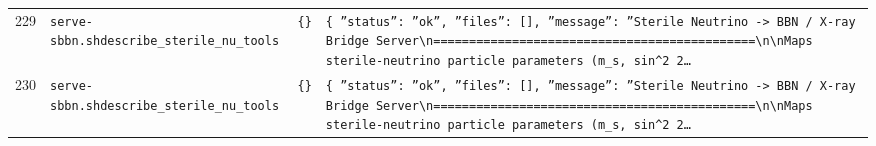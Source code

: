 \documentclass[11pt,a4paper]{article}
\begin{document}
\begin{longtable}{@{}p{}p{}p{}p{}@{}}
229 & \texttt{serve-sbbn.sh}\newline\texttt{describe\_\allowbreak{}sterile\_\allowbreak{}nu\_\allowbreak{}tools} & \texttt{\{\}\allowbreak{}} & \texttt{\{   ''status'':\allowbreak{} ''ok'',\allowbreak{}   ''files'':\allowbreak{} []\allowbreak{},\allowbreak{}   ''message'':\allowbreak{} ''Sterile Neutrino -\textgreater{}\allowbreak{} BBN /\allowbreak{} X-ray Bridge Server\textbackslash{}\allowbreak{}n=\allowbreak{}=\allowbreak{}=\allowbreak{}=\allowbreak{}=\allowbreak{}=\allowbreak{}=\allowbreak{}=\allowbreak{}=\allowbreak{}=\allowbreak{}=\allowbreak{}=\allowbreak{}=\allowbreak{}=\allowbreak{}=\allowbreak{}=\allowbreak{}=\allowbreak{}=\allowbreak{}=\allowbreak{}=\allowbreak{}=\allowbreak{}=\allowbreak{}=\allowbreak{}=\allowbreak{}=\allowbreak{}=\allowbreak{}=\allowbreak{}=\allowbreak{}=\allowbreak{}=\allowbreak{}=\allowbreak{}=\allowbreak{}=\allowbreak{}=\allowbreak{}=\allowbreak{}=\allowbreak{}=\allowbreak{}=\allowbreak{}=\allowbreak{}=\allowbreak{}=\allowbreak{}=\allowbreak{}=\allowbreak{}=\allowbreak{}=\allowbreak{}\textbackslash{}\allowbreak{}n\textbackslash{}\allowbreak{}nMaps sterile-neutrino particle parameters (m\_\allowbreak{}s,\allowbreak{} sin\textasciicircum{}\allowbreak{}2 2\ldots{}\allowbreak{}} \\
230 & \texttt{serve-sbbn.sh}\newline\texttt{describe\_\allowbreak{}sterile\_\allowbreak{}nu\_\allowbreak{}tools} & \texttt{\{\}\allowbreak{}} & \texttt{\{   ''status'':\allowbreak{} ''ok'',\allowbreak{}   ''files'':\allowbreak{} []\allowbreak{},\allowbreak{}   ''message'':\allowbreak{} ''Sterile Neutrino -\textgreater{}\allowbreak{} BBN /\allowbreak{} X-ray Bridge Server\textbackslash{}\allowbreak{}n=\allowbreak{}=\allowbreak{}=\allowbreak{}=\allowbreak{}=\allowbreak{}=\allowbreak{}=\allowbreak{}=\allowbreak{}=\allowbreak{}=\allowbreak{}=\allowbreak{}=\allowbreak{}=\allowbreak{}=\allowbreak{}=\allowbreak{}=\allowbreak{}=\allowbreak{}=\allowbreak{}=\allowbreak{}=\allowbreak{}=\allowbreak{}=\allowbreak{}=\allowbreak{}=\allowbreak{}=\allowbreak{}=\allowbreak{}=\allowbreak{}=\allowbreak{}=\allowbreak{}=\allowbreak{}=\allowbreak{}=\allowbreak{}=\allowbreak{}=\allowbreak{}=\allowbreak{}=\allowbreak{}=\allowbreak{}=\allowbreak{}=\allowbreak{}=\allowbreak{}=\allowbreak{}=\allowbreak{}=\allowbreak{}=\allowbreak{}=\allowbreak{}\textbackslash{}\allowbreak{}n\textbackslash{}\allowbreak{}nMaps sterile-neutrino particle parameters (m\_\allowbreak{}s,\allowbreak{} sin\textasciicircum{}\allowbreak{}2 2\ldots{}\allowbreak{}} \\

\end{longtable}
\end{document}
